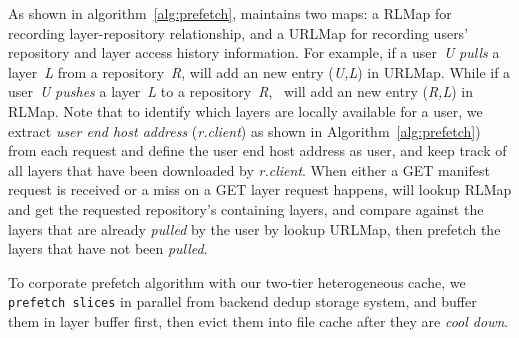 
As shown in algorithm~\ref{alg:prefetch}, \sysname maintains two maps: a RLMap for recording layer-repository
relationship, and 
a URLMap for recording 
users' repository and layer access history information. 
For example, if a user~\emph{U} \emph{pulls} a layer~\emph{L} from a repository~\emph{R},
\sysname will add an new entry (\emph{U,L}) in URLMap.
While if a user~\emph{U} \emph{pushes} a  layer~\emph{L} to a repository~\emph{R},
\sysname~will add an new entry (\emph{R,L}) in RLMap. 
Note that to identify which layers are locally available for a user, 
we extract \emph{user end host address} (\emph{r.client}) as shown in Algorithm~\ref{alg:prefetch}) from each request and define the user end host address as user,
and keep track of all layers that have been downloaded by \emph{r.client}. 
When either a GET manifest request is received or 
a miss on a GET layer request happens,
\sysname will lookup RLMap and get the requested repository's containing layers,
and compare against the layers that are already \emph{pulled} by the user by lookup URLMap,
then prefetch the layers that have not been \emph{pulled}.

To corporate prefetch algorithm with our two-tier heterogeneous cache,
we \texttt{prefetch slices} in parallel from backend dedup storage system,
and buffer them in layer buffer first, then evict them into file cache after they are \emph{cool down}.

 

